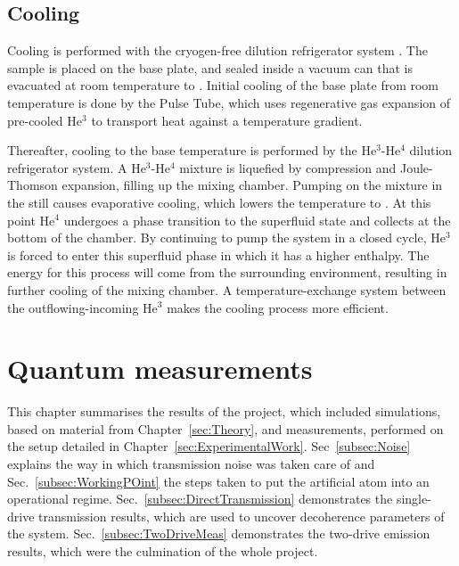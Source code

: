  \subsection{Cooling\label{subsec:Cooling}}	 
  Cooling is performed with the cryogen-free dilution refrigerator system \cite{reviewOfPulseTubeRefrigiration}. The sample is placed on the base plate, and sealed inside a vacuum can that is evacuated at room temperature to . Initial cooling of the base plate from room temperature  is done by the Pulse Tube, which uses regenerative gas expansion of pre-cooled He$ ^{3} $ to transport heat against a temperature gradient.
	 
	 
  Thereafter, cooling to the base temperature is performed by the He$ ^{3} $-He$ ^{4} $ dilution refrigerator system. A He$ ^{3} $-He$ ^{4}$ mixture is liquefied by compression and Joule-Thomson expansion, filling up the mixing chamber. Pumping on the mixture in the still causes evaporative cooling, which lowers the temperature to . At this point He$ ^{4} $ undergoes a phase transition to the superfluid state and collects at the bottom of the chamber. By continuing to pump the system in a closed cycle, He$ ^{3} $ is forced to enter this superfluid phase in which it has a higher enthalpy. The energy for this process will come from the surrounding environment, resulting in further cooling of the mixing chamber. A temperature-exchange system between the outflowing-incoming He$ ^3 $ makes the cooling process more efficient.

\newpage
\section{Quantum measurements\label{sec:Outcomes}}
 This chapter summarises the results of the project, which included simulations, based on material from Chapter~\ref{sec:Theory}, and measurements, performed on the setup detailed in Chapter~\ref{sec:ExperimentalWork}. Sec~\ref{subsec:Noise} explains the way in which transmission noise was taken care of and Sec.~\ref{subsec:WorkingPOint} the steps taken to put the artificial atom into an operational regime. Sec.~\ref{subsec:DirectTransmission} demonstrates the single-drive transmission results, which are used to uncover decoherence parameters of the system. Sec.~\ref{subsec:TwoDriveMeas} demonstrates the two-drive emission results, which were the culmination of the whole project.
